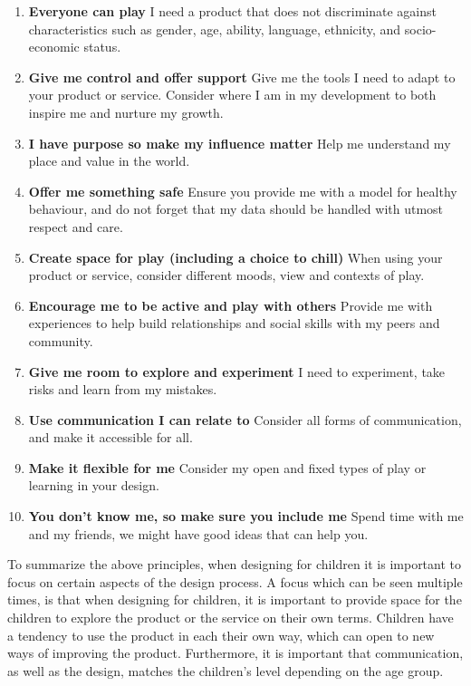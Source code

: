 \begin{enumerate}\label{princelist}
    \item \textbf{Everyone can play} I need a product that does not discriminate against characteristics such as gender, age, ability, language, ethnicity, and socio-economic status.
    \item \textbf{Give me control and offer support} Give me the tools I need to adapt to your product or service. Consider where I am in my development to both inspire me and nurture my growth.
    \item \textbf{I have purpose so make my influence matter} Help me understand my place and value in the world.
    \item \textbf{Offer me something safe} Ensure you provide me with a model for healthy behaviour, and do not forget that my data should be handled with utmost respect and care.
    \item \textbf{Create space for play (including a choice to chill)} When using your product or service, consider different moods, view and contexts of play.
    \item \textbf{Encourage me to be active and play with others} Provide me with experiences to help build relationships and social skills with my peers and community. 
    \item \textbf{Give me room to explore and experiment} I need to experiment, take risks and learn from my mistakes.
    \item \textbf{Use communication I can relate to} Consider all forms of communication, and make it accessible for all.
    \item \textbf{Make it flexible for me} Consider my open and fixed types of play or learning in your design.
    \item \textbf{You don’t know me, so make sure you include me} Spend time with me and my friends, we might have good ideas that can help you.
\end{enumerate}

To summarize the above principles, when designing for children it is important to focus on certain aspects of the design process. A focus which can be seen multiple times, is that when designing for children, it is important to provide space for the children to explore the product or the service on their own terms. Children have a tendency to use the product in each their own way, which can open to new ways of improving the product. Furthermore, it is important that communication, as well as the design, matches the children's level depending on the age group. 

